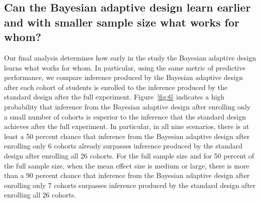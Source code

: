 \documentclass{acm_proc_article-sp}
\begin{document}
\subsection{Can the Bayesian adaptive design learn earlier and with smaller sample size what works for whom?}
Our final analysis determines how early in the study the Bayesian adaptive design learns what works for whom. In particular, using the same metric of predictive performance, we compare inference produced by the Bayesian adaptive design after each cohort of students is enrolled to the inference produced by the standard design after the full experiment. Figure~\ref{fig:6} indicates a high probability that inference from the Bayesian adaptive design after enrolling only a small number of cohorts is superior to the inference that the standard design achieves after the full experiment. In particular, in all nine scenarios, there is at least a 50 percent chance that inference from the Bayesian adaptive design after enrolling only 6 cohorts already surpasses inference produced by the standard design after enrolling all 26 cohorts. For the full sample size and for 50 percent of the full sample size, when the mean effect size is medium or large, there is more than a 90 percent chance that inference from the Bayesian adaptive design after enrolling only 7 cohorts surpasses inference produced by the standard design after enrolling all 26 cohorts. 
\end{document}
